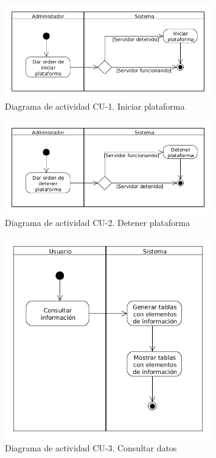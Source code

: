 \begin{figure}[!hbt]
  \begin{center}
  \includegraphics[width=0.8\textwidth]{imagenes/diagrama_actividad_cu_1.png}
  \caption{Diagrama de actividad CU-1. Iniciar plataforma}
  \label{fig:diag_ca_us_1}
  \end{center}
\end{figure}

\begin{figure}[!hbt]
  \begin{center}
  \includegraphics[width=0.8\textwidth]{imagenes/diagrama_actividad_cu_2.png}
  \caption{Diagrama de actividad CU-2. Detener plataforma}
  \label{fig:diag_ca_us_2}
  \end{center}
\end{figure}

\begin{figure}[!hbt]
  \begin{center}
  \includegraphics[width=0.8\textwidth]{imagenes/diagrama_actividad_cu_3.png}
  \caption{Diagrama de actividad CU-3. Consultar datos}
  \label{fig:diag_ca_us_3}
  \end{center}
\end{figure}


